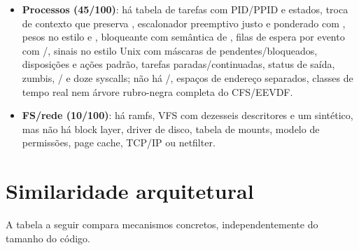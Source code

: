 \begin{itemize}
  \item \textbf{Processos (45/100)}: h\'a tabela de tarefas com PID/PPID e
        estados, troca de contexto que preserva , escalonador
        preemptivo justo e ponderado com , pesos no estilo
         e , 
        bloqueante com sem\^antica de , filas de
        espera por evento com /, sinais no
        estilo Unix com m\'ascaras de pendentes/bloqueados, disposi\c{c}\~oes e
        a\c{c}\~oes padr\~ao, tarefas paradas/continuadas, status de sa\'ida,
        zumbis, / e doze syscalls; n\~ao h\'a
        /, espa\c{c}os de endere\c{c}o separados,
        classes de tempo real nem \'arvore rubro-negra completa do CFS/EEVDF.
  \item \textbf{FS/rede (10/100)}: h\'a ramfs, VFS com dezesseis descritores e
        um  sint\'etico, mas n\~ao h\'a block layer, driver de
        disco, tabela de mounts, modelo de permiss\~oes, page cache, TCP/IP ou
        netfilter.
\end{itemize}

\section{Similaridade arquitetural}

A tabela a seguir compara mecanismos concretos, independentemente do tamanho
do c\'odigo.

